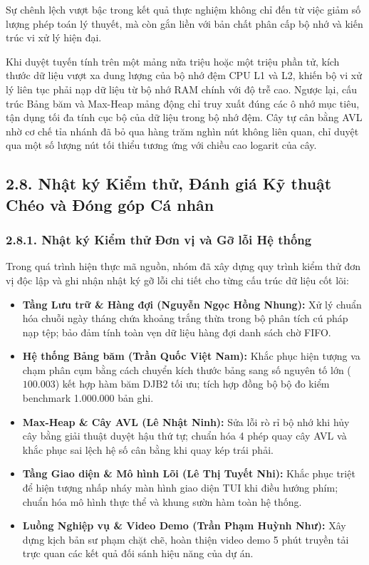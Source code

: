 \documentclass[14pt,a4paper]{extarticle}
\begin{document}
Sự chênh lệch vượt bậc trong kết quả thực nghiệm không chỉ đến từ việc giảm số lượng phép toán lý thuyết, mà còn gắn liền với bản chất phân cấp bộ nhớ và kiến trúc vi xử lý hiện đại.

Khi duyệt tuyến tính trên một mảng nửa triệu hoặc một triệu phần tử, kích thước dữ liệu vượt xa dung lượng của bộ nhớ đệm CPU L1 và L2, khiến bộ vi xử lý liên tục phải nạp dữ liệu từ bộ nhớ RAM chính với độ trễ cao. Ngược lại, cấu trúc Bảng băm và Max-Heap mảng động chỉ truy xuất đúng các ô nhớ mục tiêu, tận dụng tối đa tính cục bộ của dữ liệu trong bộ nhớ đệm. Cây tự cân bằng AVL nhờ cơ chế tỉa nhánh đã bỏ qua hàng trăm nghìn nút không liên quan, chỉ duyệt qua một số lượng nút tối thiểu tương ứng với chiều cao logarit của cây.

\subsection*{2.8. Nhật ký Kiểm thử, Đánh giá Kỹ thuật Chéo và Đóng góp Cá nhân}

\subsubsection*{2.8.1. Nhật ký Kiểm thử Đơn vị và Gỡ lỗi Hệ thống}

Trong quá trình hiện thực mã nguồn, nhóm đã xây dựng quy trình kiểm thử đơn vị độc lập và ghi nhận nhật ký gỡ lỗi chi tiết cho từng cấu trúc dữ liệu cốt lõi:
\begin{itemize}[leftmargin=1.5cm, itemsep=3pt, parsep=0pt, topsep=2pt]
    \item \textbf{Tầng Lưu trữ \& Hàng đợi (Nguyễn Ngọc Hồng Nhung):} Xử lý chuẩn hóa chuỗi ngày tháng chứa khoảng trắng thừa trong bộ phân tích cú pháp nạp tệp; bảo đảm tính toàn vẹn dữ liệu hàng đợi danh sách chờ FIFO.
    \item \textbf{Hệ thống Bảng băm (Trần Quốc Việt Nam):} Khắc phục hiện tượng va chạm phân cụm bằng cách chuyển kích thước bảng sang số nguyên tố lớn ($100.003$) kết hợp hàm băm DJB2 tối ưu; tích hợp đồng bộ bộ đo kiểm benchmark 1.000.000 bản ghi.
    \item \textbf{Max-Heap \& Cây AVL (Lê Nhật Ninh):} Sửa lỗi rò rỉ bộ nhớ khi hủy cây bằng giải thuật duyệt hậu thứ tự; chuẩn hóa 4 phép quay cây AVL và khắc phục sai lệch hệ số cân bằng khi quay kép trái phải.
    \item \textbf{Tầng Giao diện \& Mô hình Lõi (Lê Thị Tuyết Nhi):} Khắc phục triệt để hiện tượng nhấp nháy màn hình giao diện TUI khi điều hướng phím; chuẩn hóa mô hình thực thể và khung sườn hàm toàn hệ thống.
    \item \textbf{Luồng Nghiệp vụ \& Video Demo (Trần Phạm Huỳnh Như):} Xây dựng kịch bản sư phạm chặt chẽ, hoàn thiện video demo 5 phút truyền tải trực quan các kết quả đối sánh hiệu năng của dự án.
\end{itemize}
\end{document}
